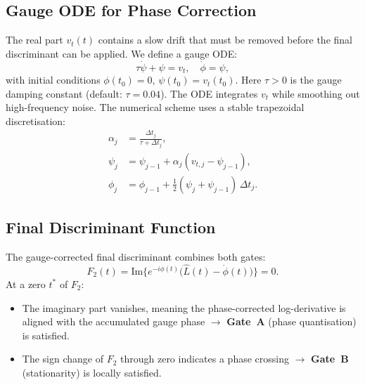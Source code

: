 \documentclass[11pt, a4paper]{article}
\theoremstyle{definition}
\theoremstyle{plain}
\newcommand{\Lhat}{\hat{L}}                %
\begin{document}
\subsection{Gauge ODE for Phase Correction}
\label{sec:gauge_ode}

The real part $v_t(t)$ contains a slow drift that must be removed
before the final discriminant can be applied. We define a gauge ODE:
\begin{equation}
  \tau\dot{\psi} + \psi = v_t, \quad \dot{\phi} = \psi,
  \label{eq:gauge_ode}
\end{equation}
with initial conditions $\phi(t_0) = 0$, $\psi(t_0) = v_t(t_0)$. Here
$\tau > 0$ is the gauge damping constant (default: $\tau = 0.04$). The
ODE integrates $v_t$ while smoothing out high-frequency noise. The
numerical scheme uses a stable trapezoidal discretisation:
\begin{align}
  \alpha_j &= \frac{\Delta t_j}{\tau + \Delta t_j},
  \label{eq:ode_alpha}\\
  \psi_j &= \psi_{j-1} + \alpha_j(v_{t,j} - \psi_{j-1}),
  \label{eq:ode_psi}\\
  \phi_j &= \phi_{j-1} + \tfrac{1}{2}(\psi_j + \psi_{j-1})\,\Delta t_j.
  \label{eq:ode_phi}
\end{align}


\subsection{Final Discriminant Function}
\label{sec:discriminant}

The gauge-corrected final discriminant combines both gates:
\begin{equation}
\boxed{
  F_2(t) = \mathrm{Im}\!\Big\{
    e^{-i\phi(t)}\Big(\Lhat(t) - \dot{\phi}(t)\Big)
  \Big\} = 0.
}
\label{eq:F2}
\end{equation}
At a zero $t^*$ of $F_2$:
\begin{itemize}
  \item The imaginary part vanishes, meaning the phase-corrected
        log-derivative is aligned with the accumulated gauge phase
        $\to$ \textbf{Gate~A} (phase quantisation) is satisfied.
  \item The sign change of $F_2$ through zero indicates a phase crossing
        $\to$ \textbf{Gate~B} (stationarity) is locally satisfied.
\end{itemize}
\end{document}
